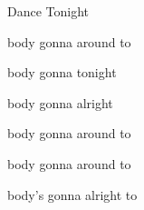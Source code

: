 \begin{SBSong}{Dance Tonight}
\begin{SBVerse}
    body gonna  around to
  \end{SBVerse}
  \CBPageBrk
  \begin{SBVerse}
    body gonna  tonight

    body gonna  alright

    body gonna  around to

    body gonna  around to

    body's gonna  alright to
  \end{SBVerse}
\end{SBSong}

